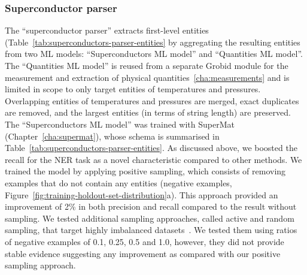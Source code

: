 \subsubsection{Superconductor parser}
\label{Superconductor parser}
The ``superconductor parser'' extracts first-level entities (Table~\ref{tab:superconductors-parser-entities} by aggregating the resulting entities from two ML models: ``Superconductors ML model'' and ``Quantities ML model''.
The ``Quantities ML model'' is reused from a separate Grobid module for the measurement and extraction of physical quantities~\ref{cha:measurements} and is limited in scope to only target entities of temperatures and pressures.
Overlapping entities of temperatures and pressures are merged, exact duplicates are removed, and the largest entities (in terms of string length) are preserved.
The ``Superconductors ML model'' was trained with SuperMat (Chapter~\ref{cha:supermat}), whose schema is summarised in Table~\ref{tab:superconductors-parser-entities}.
As discussed above, we boosted the recall for the NER task as a novel characteristic compared to other methods.
We trained the model by applying positive sampling, which consists of removing examples that do not contain any entities (negative examples, Figure~\ref{fig:training-holdout-set-distribution}a).
This approach provided an improvement of 2\% in both precision and recall compared to the result without sampling.
We tested additional sampling approaches, called active and random sampling, that target highly imbalanced datasets~\cite{lopez2021mining}. We tested them using ratios of negative examples of 0.1, 0.25, 0.5 and 1.0, however, they did not provide stable evidence suggesting any improvement as compared with our positive sampling approach. 

